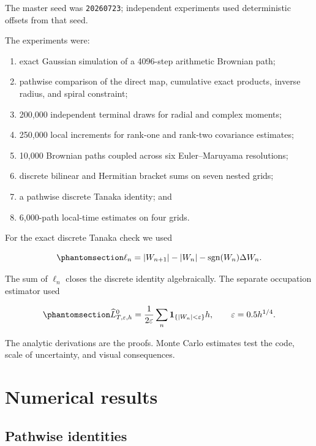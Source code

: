 \documentclass[
  english,
  10pt,
  letterpaper,
  DIV=11,
  numbers=noendperiod]{scrartcl}
\providecommand{\tightlist}{%
  \setlength{\itemsep}{0pt}\setlength{\parskip}{0pt}}
\theoremstyle{plain}
\theoremstyle{remark}
\begin{document}
The master seed was \texttt{20260723}; independent experiments used
deterministic offsets from that seed.

The experiments were:

\begin{enumerate}
\def\labelenumi{\arabic{enumi}.}
\tightlist
\item
  exact Gaussian simulation of a 4096-step arithmetic Brownian path;
\item
  pathwise comparison of the direct map, cumulative exact products,
  inverse radius, and spiral constraint;
\item
  200,000 independent terminal draws for radial and complex moments;
\item
  250,000 local increments for rank-one and rank-two covariance
  estimates;
\item
  10,000 Brownian paths coupled across six Euler--Maruyama resolutions;
\item
  discrete bilinear and Hermitian bracket sums on seven nested grids;
\item
  a pathwise discrete Tanaka identity; and
\item
  6,000-path local-time estimates on four grids.
\end{enumerate}

For the exact discrete Tanaka check we used

\begin{equation}\protect\phantomsection\label{eq-discrete-tanaka-increment}{
\ell_n
=|W_{n+1}|-|W_n|-\operatorname{sgn}(W_n)\Delta W_n.
}\end{equation}

The sum of \(\ell_n\) closes the discrete identity algebraically. The
separate occupation estimator used

\begin{equation}\protect\phantomsection\label{eq-occupation-estimator}{
\widehat L_{T,\varepsilon,h}^0
=\frac1{2\varepsilon}
\sum_n\mathbf1_{\{|W_n|<\varepsilon\}}h,
\qquad \varepsilon=0.5h^{1/4}.
}\end{equation}

The analytic derivations are the proofs. Monte Carlo estimates test the
code, scale of uncertainty, and visual consequences.

\section{Numerical results}\label{sec-results}

\subsection{Pathwise identities}\label{pathwise-identities}
\end{document}

